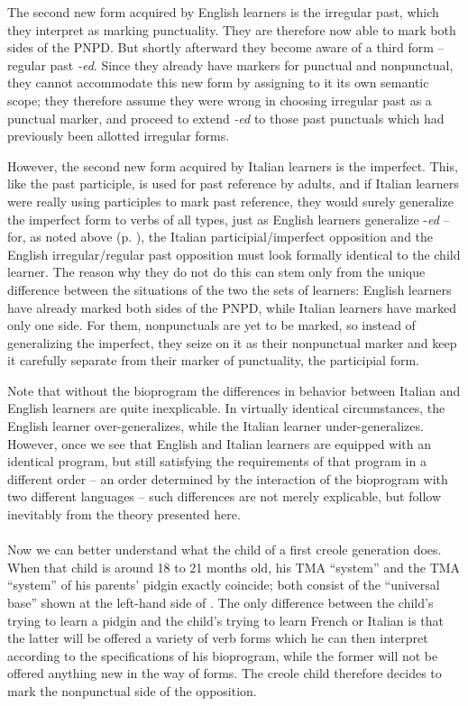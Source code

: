 The second new form acquired by English learners is the irregular past, which they interpret as marking punctuality. They are therefore now able to mark both sides of the PNPD. But shortly afterward they become aware of a third form -- regular past \textit{-ed}. Since they already have markers for punctual and nonpunctual, they cannot accommodate this new form by assigning to it its own semantic scope; they therefore assume they were wrong in choosing irregular past as a punctual marker, and proceed to extend \textit{-ed} to those past punctuals which had previously been allotted irregular forms.

However, the second new form acquired by Italian learners is the imperfect. This, like the past participle, is used for past reference by adults, and if Italian learners were really using participles to mark past reference, they would surely generalize the imperfect form to verbs of all types, just as English learners generalize -\textit{ed} -- for, as noted above (p. \pageref{edaffix}), the Italian participial/imperfect opposition and the English irregular/regular past opposition must look formally identical to the child learner. The reason why they do not do this can stem only from the unique difference between the situations of the two the sets of learners: English learners have already marked both sides of 
the PNPD, while Italian learners have marked only one side. For them, nonpunctuals are yet to be marked, so instead of generalizing the imperfect, they seize on it as their nonpunctual marker and keep it carefully separate from their marker of punctuality, the participial form.

Note that without the bioprogram the differences in behavior between Italian and English learners are quite inexplicable. In virtually identical circumstances, the English learner over-generalizes, while the Italian learner under-generalizes. However, once we see that English and Italian learners are equipped with an identical program, but still satisfying the requirements of that program in a different order -- an order determined by the interaction of the bioprogram with two different languages -- such differences are not merely explicable, but follow inevitably from the theory presented here.\\\\

Now we can better understand what the child of a first creole generation does. When that child is around 18 to 21 months old, his TMA ``system'' and the TMA ``system'' of his parents' pidgin exactly coincide; both consist of the ``universal base'' shown at the left-hand side of . The only difference between the child's trying to learn a pidgin and the child's trying to learn French or Italian is that the latter will be offered a variety of verb forms which he can then interpret according to the specifications of his bioprogram, while the former will not be offered anything new in the way of forms. The creole child therefore decides to mark the nonpunctual side of the opposition.

